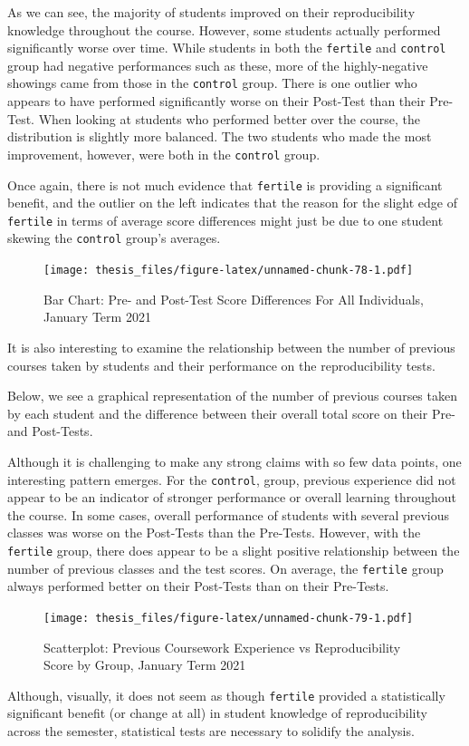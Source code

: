 \documentclass[12pt,twoside]{reedthesis}
\begin{document}
As we can see, the majority of students improved on their reproducibility knowledge throughout the course. However, some students actually performed significantly worse over time. While students in both the \texttt{fertile} and \texttt{control} group had negative performances such as these, more of the highly-negative showings came from those in the \texttt{control} group. There is one outlier who appears to have performed significantly worse on their Post-Test than their Pre-Test. When looking at students who performed better over the course, the distribution is slightly more balanced. The two students who made the most improvement, however, were both in the \texttt{control} group.

Once again, there is not much evidence that \texttt{fertile} is providing a significant benefit, and the outlier on the left indicates that the reason for the slight edge of \texttt{fertile} in terms of average score differences might just be due to one student skewing the \texttt{control} group's averages.
\begin{figure}
\centering
\texttt{[image: thesis\_files/figure-latex/unnamed-chunk-78-1.pdf]}
\caption{\label{fig:unnamed-chunk-78}Bar Chart: Pre- and Post-Test Score Differences For All Individuals, January Term 2021}
\end{figure}
It is also interesting to examine the relationship between the number of previous courses taken by students and their performance on the reproducibility tests.

Below, we see a graphical representation of the number of previous courses taken by each student and the difference between their overall total score on their Pre- and Post-Tests.

Although it is challenging to make any strong claims with so few data points, one interesting pattern emerges. For the \texttt{control}, group, previous experience did not appear to be an indicator of stronger performance or overall learning throughout the course. In some cases, overall performance of students with several previous classes was worse on the Post-Tests than the Pre-Tests. However, with the \texttt{fertile} group, there does appear to be a slight positive relationship between the number of previous classes and the test scores. On average, the \texttt{fertile} group always performed better on their Post-Tests than on their Pre-Tests.
\begin{figure}
\centering
\texttt{[image: thesis\_files/figure-latex/unnamed-chunk-79-1.pdf]}
\caption{\label{fig:unnamed-chunk-79}Scatterplot: Previous Coursework Experience vs Reproducibility Score by Group, January Term 2021}
\end{figure}
Although, visually, it does not seem as though \texttt{fertile} provided a statistically significant benefit (or change at all) in student knowledge of reproducibility across the semester, statistical tests are necessary to solidify the analysis.
\end{document}

